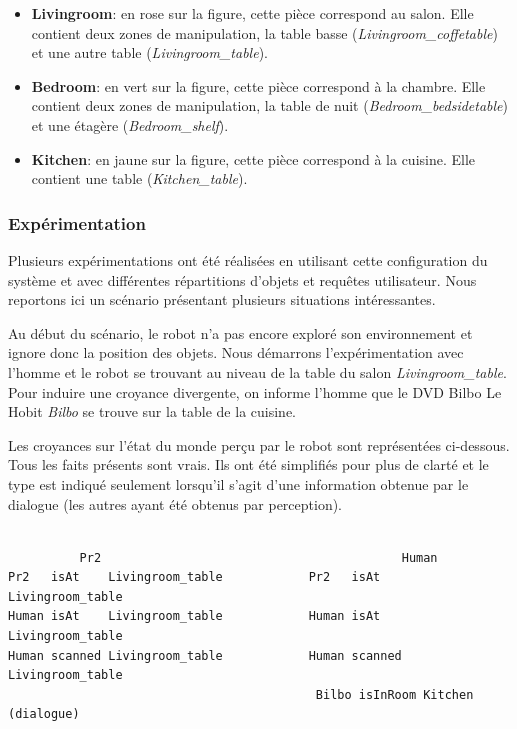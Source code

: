 \documentclass[a4paper,11pt,twoside]{StyleThese}
\begin{document}
\begin{itemize}
\item \textbf{Livingroom}: en rose sur la figure, cette pièce correspond au salon.
Elle contient deux zones de manipulation, la table basse (\textit{Livingroom\_coffetable}) et une autre table (\textit{Livingroom\_table}).

\item \textbf{Bedroom}: en vert sur la figure, cette pièce correspond à la chambre. Elle contient deux zones de manipulation, la table de nuit (\textit{Bedroom\_bedsidetable}) et une étagère (\textit{Bedroom\_shelf}).

\item \textbf{Kitchen}: en jaune sur la figure, cette pièce correspond à la cuisine. Elle contient une table (\textit{Kitchen\_table}).
\end{itemize}

\subsubsection{Expérimentation}


Plusieurs expérimentations ont été réalisées en utilisant cette configuration du système et avec différentes répartitions d'objets et requêtes utilisateur. Nous reportons ici un scénario présentant plusieurs situations intéressantes.

Au début du scénario, le robot n'a pas encore exploré son environnement et ignore donc la position des objets.
Nous démarrons l'expérimentation avec l'homme et le robot se trouvant au niveau de  la table du salon \textit{Livingroom\_table}. Pour induire une croyance divergente, on informe l'homme que le DVD Bilbo Le Hobit \textit{Bilbo} se trouve sur la table de la cuisine.

Les croyances sur l'état du monde perçu par le robot sont représentées ci-dessous.
Tous les faits présents sont vrais. Ils ont été simplifiés pour plus de clarté et le type est indiqué seulement lorsqu'il s'agit d'une information obtenue par le dialogue (les autres ayant été obtenus par perception).


\begin{scriptsize}
\begin{verbatim}

          Pr2                                          Human
Pr2   isAt    Livingroom_table            Pr2   isAt     Livingroom_table
Human isAt    Livingroom_table            Human isAt     Livingroom_table
Human scanned Livingroom_table            Human scanned  Livingroom_table
                                           Bilbo isInRoom Kitchen  (dialogue)
\end{verbatim}
\end{scriptsize}
\end{document}
